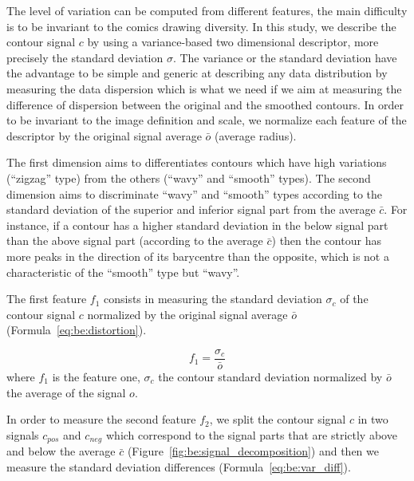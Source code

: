 The level of variation can be computed from different features, the main difficulty is to be invariant to the comics drawing diversity. 
In this study, we describe the contour signal $c$ by using a variance-based two dimensional descriptor, more precisely the standard deviation $\sigma$. The variance or the standard deviation have the advantage to be simple and generic at describing any data distribution by measuring the data dispersion which is what we need if we aim at measuring the difference of dispersion between the original and the smoothed contours. In order to be invariant to the image definition and scale, we normalize each feature of the descriptor by the original signal average $\bar{o}$ (average radius).

The first dimension aims to differentiates contours which have high variations (``zigzag'' type) from the others (``wavy'' and ``smooth'' types). The second dimension aims to discriminate ``wavy'' and ``smooth'' types according to the standard deviation of the superior and inferior signal part from the average $\bar{c}$. For instance, if a contour has a higher standard deviation in the below signal part than the above signal part (according to the average $\bar{c}$) then the contour has more peaks in the direction of its barycentre than the opposite, which is not a characteristic of the ``smooth'' type but ``wavy''.

The first feature $f_1$ consists in measuring the standard deviation $\sigma_c$ of the contour signal $c$ normalized by the original signal average $\bar{o}$ (Formula~\ref{eq:be:distortion}).


\begin{equation}\label{eq:be:distortion}
 f_1 = \frac{\sigma_c}{\bar{o}}%
\end{equation}
where $f_1$ is the feature one, $\sigma_c$ the contour standard deviation normalized by $\bar{o}$ the average of the signal $o$. 


In order to measure the second feature $f_2$, we split the contour signal $c$ in two signals $c_{pos}$ and $c_{neg}$ which correspond to the signal parts that are strictly above and below the average $\bar{c}$ (Figure~\ref{fig:be:signal_decomposition}) and then we measure the standard deviation differences (Formula~\ref{eq:be:var_diff}).%


